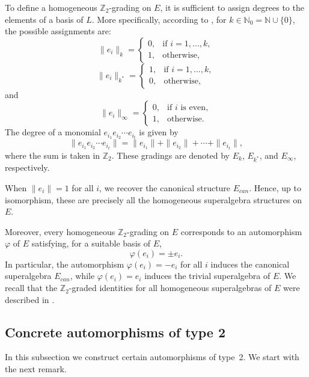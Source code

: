 \documentclass{article}
\begin{document}
	To define a homogeneous $\mathbb{Z}_{2}$-grading on $E$, it is sufficient to assign degrees to the elements of a basis of $L$. More specifically, according to \cite{disil}, for $k \in \mathbb{N}_0 = \mathbb{N} \cup \{0\}$, the possible assignments are:
	\[
	\|e_{i}\|_{k}=
	\begin{cases} 
		0, & \text{if } i=1,\ldots,k, \\[2pt] 
		1, & \text{otherwise},
	\end{cases}
	\]
	\[
	\|e_{i}\|_{k^\ast}=
	\begin{cases} 
		1, & \text{if } i=1,\ldots,k, \\[2pt] 
		0, & \text{otherwise},
	\end{cases}
	\]
	and
	\[
	\|e_{i}\|_{\infty}=
	\begin{cases} 
		0, & \text{if $i$ is even}, \\[2pt] 
		1, & \text{otherwise}.
	\end{cases}
	\]
	The degree of a monomial $e_{i_1}e_{i_2}\cdots e_{i_t}$ is given by
	\[
	\|e_{i_1}e_{i_2}\cdots e_{i_t}\| 
	= \|e_{i_1}\| + \|e_{i_2}\| + \cdots + \|e_{i_t}\|, 
	\]
	where the sum is taken in $\mathbb{Z}_{2}$. These gradings are denoted by $E_{k}$, $E_{k^\ast}$, and $E_{\infty}$, respectively.  
	
	When $\|e_{i}\| = 1$ for all $i$, we recover the canonical structure $E_{can}$. Hence, up to isomorphism, these are precisely all the homogeneous superalgebra structures on $E$.
	
	
	
	Moreover, every homogeneous $\mathbb{Z}_{2}$-grading on $E$ corresponds to an automorphism $\varphi$ of $E$ satisfying, for a suitable basis of $E$,
	\[
	\varphi(e_i) = \pm e_i.
	\]
	In particular, the automorphism $\varphi(e_{i}) = -e_{i}$ for all $i$ induces the canonical superalgebra $E_{can}$, while $\varphi(e_{i}) = e_{i}$ induces the trivial superalgebra of $E$. We recall that the $\mathbb{Z}_2$-graded identities for all homogeneous superalgebras of $E$ were described in \cite{disil, centroneP, LFG}.
	
	
	
	
	
	
	\subsection{Concrete automorphisms of type 2}
	
	
	
	In this subsection we construct certain automorphisms of type~2. We start with the next remark.
	
\end{document}
